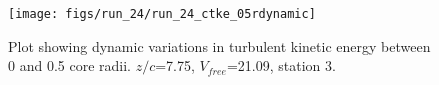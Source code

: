 \begin{figure}[H]
\centering
\texttt{[image: figs/run\_24/run\_24\_ctke\_05rdynamic]}
\caption{Plot showing dynamic variations in turbulent kinetic energy between 0 and 0.5 core radii. $z/c$=7.75, $V_{free}$=21.09, station 3.}
\label{fig:run_24_ctke_05rdynamic}
\end{figure}


